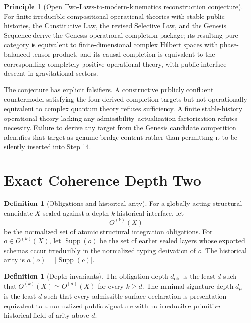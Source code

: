 \documentclass[11pt]{article}
\theoremstyle{plain}
\theoremstyle{definition}
\newtheorem{definition}[theorem]{Definition}
\newtheorem{principle}[theorem]{Principle}
\theoremstyle{remark}
\newcommand{\Supp}{\operatorname{Supp}}
\begin{document}
\begin{principle}[Open Two-Laws-to-modern-kinematics reconstruction conjecture]
For finite irreducible compositional operational theories with stable public histories, the Constitutive Law, the revised Selective Law, and the Genesis Sequence derive the Genesis operational-completion package; its resulting pure category is equivalent to finite-dimensional complex Hilbert spaces with phase-balanced tensor product, and its causal completion is equivalent to the corresponding completely positive operational theory, with public-interface descent in gravitational sectors.
\end{principle}

The conjecture has explicit falsifiers. A constructive publicly confluent countermodel satisfying the four derived completion targets but not operationally equivalent to complex quantum theory refutes sufficiency. A finite stable-history operational theory lacking any admissibility--actualization factorization refutes necessity. Failure to derive any target from the Genesis candidate competition identifies that target as genuine bridge content rather than permitting it to be silently inserted into Step 14.

\section{Exact Coherence Depth Two}

\begin{definition}[Obligations and historical arity]
For a globally acting structural candidate \(X\) sealed against a depth-\(k\) historical interface, let
\[
O^{(k)}(X)
\]
be the normalized set of atomic structural integration obligations. For \(o\in O^{(k)}(X)\), let \(\Supp(o)\) be the set of earlier sealed layers whose exported schemas occur irreducibly in the normalized typing derivation of \(o\). The historical arity is \(a(o)=|\Supp(o)|\).
\end{definition}

\begin{definition}[Depth invariants]
The obligation depth \(d_{\mathrm{obl}}\) is the least \(d\) such that \(O^{(k)}(X)\simeq O^{(d)}(X)\) for every \(k\ge d\). The minimal-signature depth \(d_\mu\) is the least \(d\) such that every admissible surface declaration is presentation-equivalent to a normalized public signature with no irreducible primitive historical field of arity above \(d\).
\end{definition}
\end{document}
